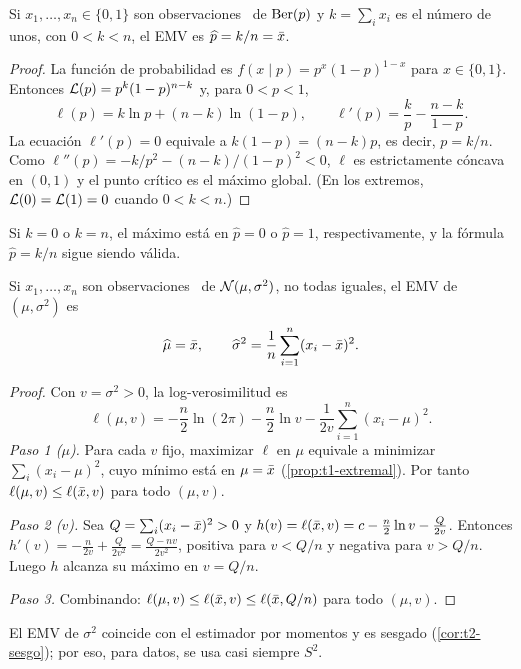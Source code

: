 \begin{teorema}\label{teo:t4-emv-bernoulli}
Si $x_1,\dots,x_n\in\{0,1\}$ son observaciones \iid\ de $\operatorname{Ber}(p)$ y $k=\sum_ix_i$ es el número de unos, con $0<k<n$, el EMV es $\widehat p=k/n=\bar{x}$.
\end{teorema}

\begin{proof}
La función de probabilidad es $f(x\mid p)=p^{x}(1-p)^{1-x}$ para $x\in\{0,1\}$. Entonces $\mathcal{L}(p)=p^{k}(1-p)^{n-k}$ y, para $0<p<1$,
\[
\ell(p)=k\ln p+(n-k)\ln(1-p),\qquad \ell'(p)=\frac kp-\frac{n-k}{1-p}.
\]
La ecuación $\ell'(p)=0$ equivale a $k(1-p)=(n-k)p$, es decir, $p=k/n$. Como $\ell''(p)=-k/p^{2}-(n-k)/(1-p)^{2}<0$, $\ell$ es estrictamente cóncava en $(0,1)$ y el punto crítico es el máximo global. (En los extremos, $\mathcal{L}(0)=\mathcal{L}(1)=0$ cuando $0<k<n$.)
\end{proof}

Si $k=0$ o $k=n$, el máximo está en $\widehat p=0$ o $\widehat p=1$, respectivamente, y la fórmula $\widehat p=k/n$ sigue siendo válida.

\begin{teorema}\label{teo:t4-emv-normal}
Si $x_1,\dots,x_n$ son observaciones \iid\ de $\mathcal{N}(\mu,\sigma^{2})$, no todas iguales, el EMV de $(\mu,\sigma^{2})$ es
\[
\widehat\mu=\bar{x},\qquad\widehat\sigma^{2}=\frac1n\sum_{i=1}^{n}(x_i-\bar{x})^{2}.
\]
\end{teorema}

\begin{proof}
Con $v=\sigma^{2}>0$, la log-verosimilitud es
\[
\ell(\mu,v)=-\frac n2\ln(2\pi)-\frac n2\ln v-\frac{1}{2v}\sum_{i=1}^{n}(x_i-\mu)^{2}.
\]
\emph{Paso 1 ($\mu$).} Para cada $v$ fijo, maximizar $\ell$ en $\mu$ equivale a minimizar $\sum_i(x_i-\mu)^{2}$, cuyo mínimo está en $\mu=\bar{x}$ (\cref{prop:t1-extremal}). Por tanto $\ell(\mu,v)\le\ell(\bar{x},v)$ para todo $(\mu,v)$.

\emph{Paso 2 ($v$).} Sea $Q=\sum_i(x_i-\bar{x})^{2}>0$ y $h(v)=\ell(\bar{x},v)=c-\frac n2\ln v-\frac{Q}{2v}$. Entonces $h'(v)=-\frac{n}{2v}+\frac{Q}{2v^{2}}=\frac{Q-nv}{2v^{2}}$, positiva para $v<Q/n$ y negativa para $v>Q/n$. Luego $h$ alcanza su máximo en $v=Q/n$.

\emph{Paso 3.} Combinando: $\ell(\mu,v)\le\ell(\bar{x},v)\le\ell(\bar{x},Q/n)$ para todo $(\mu,v)$.
\end{proof}

El EMV de $\sigma^{2}$ coincide con el estimador por momentos y es sesgado (\cref{cor:t2-sesgo}); por eso, para datos, se usa casi siempre $S^{2}$.

